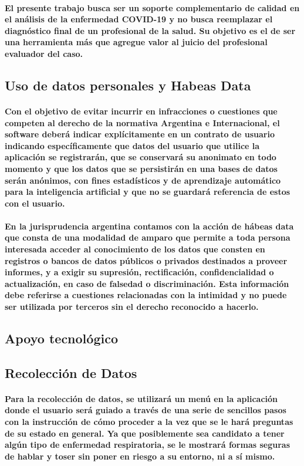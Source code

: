 \documentclass[a4paper,12pt]{article}
\begin{document}
\paragraph{El presente trabajo busca ser un soporte complementario de calidad en el análisis de la enfermedad COVID-19 y no busca reemplazar el diagnóstico final de un profesional de la salud. Su objetivo es el de ser una herramienta más que agregue valor al juicio del profesional evaluador del caso.}
\subsection{Uso de datos personales y Habeas Data}
\paragraph{Con el objetivo de evitar incurrir en infracciones o cuestiones que competen al derecho de la normativa Argentina e Internacional, el software deberá indicar explícitamente en un contrato de usuario indicando específicamente que datos del usuario que utilice la aplicación se registrarán, que se conservará su anonimato en todo momento y que los datos que se persistirán en una bases de datos serán anónimos, con fines estadísticos y de aprendizaje automático para la inteligencia artificial y que no se guardará referencia de estos con el usuario.}
\paragraph{En la jurisprudencia argentina contamos con la acción de hábeas data que consta de una modalidad de amparo que permite a toda persona interesada acceder al conocimiento de los datos que consten en registros o bancos de datos públicos o privados destinados a proveer informes, y a exigir su supresión, rectificación, confidencialidad o actualización, en caso de falsedad o discriminación. Esta información debe referirse a cuestiones relacionadas con la intimidad y no puede ser utilizada por terceros sin el derecho reconocido a hacerlo.}
\subsection{Apoyo tecnológico}
\subsection{Recolección de Datos}
\paragraph{Para la recolección de datos, se utilizará un menú en la aplicación donde el usuario será guiado a través de una serie de sencillos pasos con la instrucción de cómo proceder a la vez que se le hará preguntas de su estado en general. Ya que posiblemente sea candidato a tener algún tipo de enfermedad respiratoria, se le mostrará formas seguras de hablar y toser sin poner en riesgo a su entorno, ni a sí mismo.}
\end{document}
